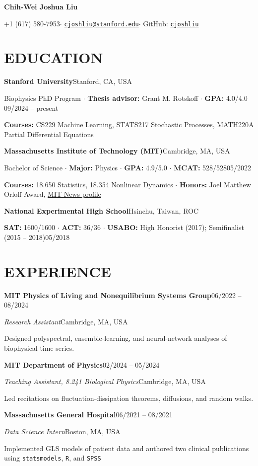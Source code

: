 \documentclass[11pt,letterpaper]{article}
\newcommand{\entry}[2]{\textbf{#1}\hfill #2\par}
\begin{document}
\fontsize{10.5}{12}\selectfont
\begin{center}
{\fontsize{18}{22}\selectfont\bfseries Chih-Wei Joshua Liu}\par
\vspace{4pt}
+1 (617) 580-7953\enspace$\cdot$\enspace
\href{mailto:cjoshliu@stanford.edu}{\texttt{cjoshliu@stanford.edu}}\enspace$\cdot$\enspace
GitHub: \href{https://github.com/cjoshliu}{\texttt{cjoshliu}}
\end{center}
\vspace{-14pt}

\section{EDUCATION}
\entry{Stanford University}{Stanford, CA, USA}
Biophysics PhD Program $\cdot$ \textbf{Thesis advisor:} Grant M. Rotskoff $\cdot$ \textbf{GPA:} 4.0/4.0 \hfill 09/2024 -- present\par
\textbf{Courses:} CS229 Machine Learning, STATS217 Stochastic Processes, MATH220A Partial Differential Equations\par

\vspace{4pt}
\entry{Massachusetts Institute of Technology (MIT)}{Cambridge, MA, USA}
Bachelor of Science $\cdot$ \textbf{Major:} Physics $\cdot$ \textbf{GPA:} 4.9/5.0 $\cdot$ \textbf{MCAT:} 528/528\hfill 05/2022\par
\textbf{Courses:} 18.650 Statistics, 18.354 Nonlinear Dynamics $\cdot$ \textbf{Honors:} Joel Matthew Orloff Award, \href{https://news.mit.edu/2022/physics-gut-brain-health-chih-wei-joshua-liu-0603}{MIT News profile} \par
\vspace{4pt}
\entry{National Experimental High School}{Hsinchu, Taiwan, ROC}
\textbf{SAT:} 1600/1600 $\cdot$ \textbf{ACT:} 36/36 $\cdot$ \textbf{USABO:} High Honorist (2017); Semifinalist (2015 -- 2018)\hfill 05/2018

\section{EXPERIENCE}
\entry{MIT Physics of Living and Nonequilibrium Systems Group}{06/2022 -- 08/2024}\par
\textit{Research Assistant}\hfill Cambridge, MA, USA\par
Designed polyspectral, ensemble-learning, and neural-network analyses of biophysical time series.\par
\entry{MIT Department of Physics}{02/2024 -- 05/2024}
\textit{Teaching Assistant, 8.241 Biological Physics}\hfill Cambridge, MA, USA\par
Led recitations on fluctuation-dissipation theorems, diffusions, and random walks.\par
\entry{Massachusetts General Hospital}{06/2021 -- 08/2021}
\textit{Data Science Intern}\hfill Boston, MA, USA\par
Implemented GLS models of patient data and authored two clinical publications using \texttt{statsmodels}, \texttt{R}, and \texttt{SPSS}\par
\end{document}

